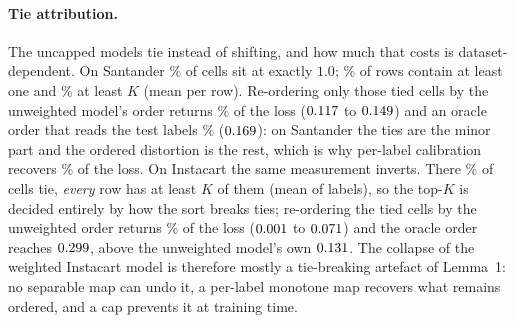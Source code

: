 \documentclass[sigconf,nonacm]{acmart}
\begin{document}
\paragraph{Tie attribution.} The uncapped models tie instead of shifting, and how much that costs is dataset-dependent. On Santander \nStieCellsExactOne\% of cells sit at exactly $1.0$; \nStieRowsGeOne\% of rows contain at least one and \nStieRowsGeK\% at least $K$ (mean \nStieCellsPerRowMean{} per row). Re-ordering only those tied cells by the unweighted model's order returns \ntieShareUnw\% of the loss ($0.117$ to $0.149$) and an oracle order that reads the test labels \ntieShareOracle\% ($0.169$): on Santander the ties are the minor part and the ordered distortion is the rest, which is why per-label calibration recovers \nrepairShare\% of the loss. On Instacart the same measurement inverts. There \nIStieCellsExactOne\% of cells tie, \emph{every} row has at least $K$ of them (mean \nIStieCellsPerRowMean{} of \nInLabels{} labels), so the top-$K$ is decided entirely by how the sort breaks ties; re-ordering the tied cells by the unweighted order returns \nItieShareUnw\% of the loss ($0.001$ to $0.071$) and the oracle order reaches $0.299$, above the unweighted model's own $0.131$. The collapse of the weighted Instacart model is therefore mostly a tie-breaking artefact of Lemma~1: no separable map can undo it, a per-label monotone map recovers what remains ordered, and a cap prevents it at training time.
\end{document}
